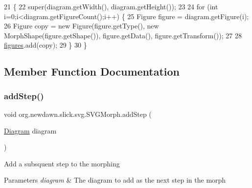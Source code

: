 \begin{DoxyCode}
21                                      \{
22         super(diagram.getWidth(), diagram.getHeight());
23         
24         \textcolor{keywordflow}{for} (\textcolor{keywordtype}{int} i=0;i<diagram.getFigureCount();i++) \{
25             Figure figure = diagram.getFigure(i);
26             Figure copy = \textcolor{keyword}{new} Figure(figure.getType(), \textcolor{keyword}{new} MorphShape(figure.getShape()), figure.getData(),
       figure.getTransform());
27             
28             \mbox{\hyperlink{classorg_1_1newdawn_1_1slick_1_1svg_1_1_s_v_g_morph_ab3f69a342347ec5d6fa4c65aa6671e4b}{figures}}.add(copy);
29         \}
30     \}
\end{DoxyCode}


\subsection{Member Function Documentation}
\mbox{\label{classorg_1_1newdawn_1_1slick_1_1svg_1_1_s_v_g_morph_ae23a44badfe2dd598ef09d4edfcbfb4d}} 
\subsubsection{\texorpdfstring{add\+Step()}{addStep()}}
{\footnotesize\ttfamily void org.\+newdawn.\+slick.\+svg.\+S\+V\+G\+Morph.\+add\+Step (\begin{DoxyParamCaption}\item[{\mbox{\hyperlink{classorg_1_1newdawn_1_1slick_1_1svg_1_1_diagram}{Diagram}}}]{diagram }\end{DoxyParamCaption})\hspace{0.3cm}{\ttfamily [inline]}}

Add a subsquent step to the morphing


\begin{DoxyParams}{Parameters}
{\em diagram} & The diagram to add as the next step in the morph \\
\hline
\end{DoxyParams}

